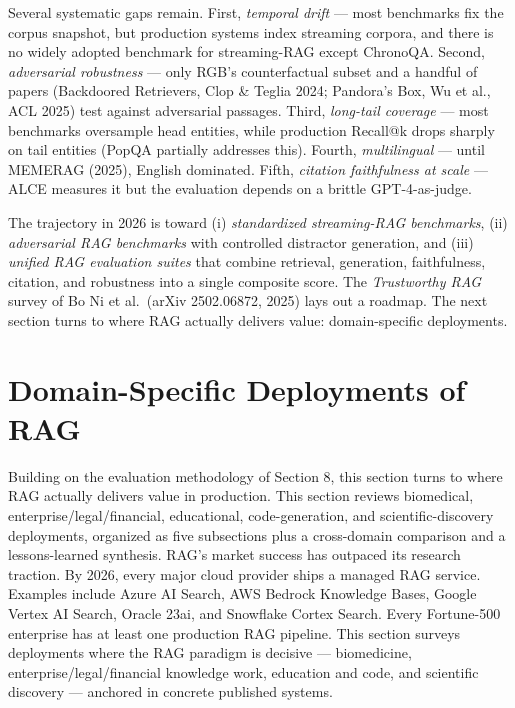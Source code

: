 \documentclass{article}
\begin{document}
Several systematic gaps remain. First, \emph{temporal drift} --- most benchmarks fix the corpus snapshot, but production systems index streaming corpora, and there is no widely adopted benchmark for streaming-RAG except ChronoQA. Second, \emph{adversarial robustness} --- only RGB's counterfactual subset and a handful of papers (Backdoored Retrievers, Clop \& Teglia 2024; Pandora's Box, Wu et al., ACL 2025) test against adversarial passages. Third, \emph{long-tail coverage} --- most benchmarks oversample head entities, while production Recall@k drops sharply on tail entities (PopQA partially addresses this). Fourth, \emph{multilingual} --- until MEMERAG (2025), English dominated. Fifth, \emph{citation faithfulness at scale} --- ALCE measures it but the evaluation depends on a brittle GPT-4-as-judge.

The trajectory in 2026 is toward (i) \emph{standardized streaming-RAG benchmarks}, (ii) \emph{adversarial RAG benchmarks} with controlled distractor generation, and (iii) \emph{unified RAG evaluation suites} that combine retrieval, generation, faithfulness, citation, and robustness into a single composite score. The \emph{Trustworthy RAG} survey of Bo Ni et al.~(arXiv 2502.06872, 2025) lays out a roadmap. The next section turns to where RAG actually delivers value: domain-specific deployments.

\section{Domain-Specific Deployments of RAG}\label{domain-specific-deployments-of-rag}

Building on the evaluation methodology of Section 8, this section turns to where RAG actually delivers value in production. This section reviews biomedical, enterprise/legal/financial, educational, code-generation, and scientific-discovery deployments, organized as five subsections plus a cross-domain comparison and a lessons-learned synthesis. RAG's market success has outpaced its research traction. By 2026, every major cloud provider ships a managed RAG service. Examples include Azure AI Search, AWS Bedrock Knowledge Bases, Google Vertex AI Search, Oracle 23ai, and Snowflake Cortex Search. Every Fortune-500 enterprise has at least one production RAG pipeline. This section surveys deployments where the RAG paradigm is decisive --- biomedicine, enterprise/legal/financial knowledge work, education and code, and scientific discovery --- anchored in concrete published systems.
\end{document}
